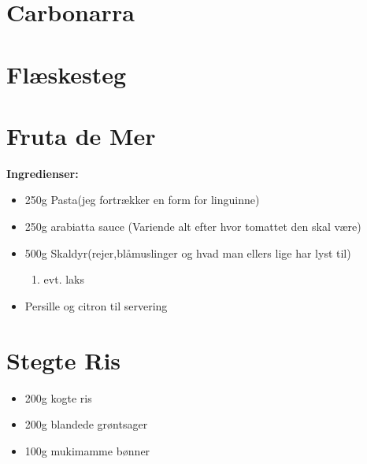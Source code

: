 \documentclass{book}
\begin{document}
{\section{Carbonarra}
\begin{minipage}[t]{0.5\textwidth}
\end{minipage}
\begin{minipage}[t]{0.5\textwidth}
\end{minipage}
\section{Flæskesteg}
\begin{minipage}[t]{0.5\textwidth}
\end{minipage}
\begin{minipage}[t]{0.5\textwidth}
\end{minipage}
\newpage \section{Fruta de Mer}
\begin{minipage}[t]{0.5\textwidth}
\textbf{Ingredienser:}
\begin{itemize}
    \item250g Pasta(jeg fortrækker en form for linguinne)
    \item250g arabiatta sauce (Variende alt efter hvor tomattet den skal være)
    \item500g Skaldyr(rejer,blåmuslinger og hvad man ellers lige har lyst til)
    \begin{enumerate}
        \item evt. laks
    \end{enumerate}
    \item Persille og citron til servering
\end{itemize}
\end{minipage}
\newpage
{}
\newpage \section{Stegte Ris}
\begin{minipage}[t]{0.5\textwidth}
\begin{itemize}
    \item 200g kogte ris
    \item 200g blandede grøntsager
    \item 100g mukimamme bønner

\end{itemize}
\end{minipage}}
\end{document}

